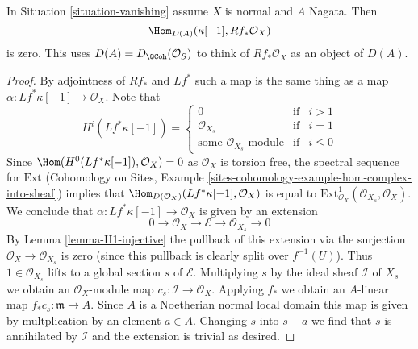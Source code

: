 \begin{lemma}
\label{lemma-R1-injective}
In Situation \ref{situation-vanishing} assume $X$ is normal and $A$ Nagata.
Then
$$
\Hom_{D(A)}(\kappa[-1], Rf_*\mathcal{O}_X)
$$
is zero. This uses $D(A) = D_\QCoh(\mathcal{O}_S)$ to think of
$Rf_*\mathcal{O}_X$ as an object of $D(A)$.
\end{lemma}

\begin{proof}
By adjointness of $Rf_*$ and $Lf^*$ such a map is the same thing
as a map $\alpha : Lf^*\kappa[-1] \to \mathcal{O}_X$. Note that
$$
H^i(Lf^*\kappa[-1]) =
\left\{
\begin{matrix}
0 & \text{if} & i > 1 \\
\mathcal{O}_{X_s} & \text{if} & i = 1 \\
\text{some }\mathcal{O}_{X_s}\text{-module} & \text{if} & i \leq 0
\end{matrix}
\right.
$$
Since $\Hom(H^0(Lf^*\kappa[-1]), \mathcal{O}_X) = 0$ as $\mathcal{O}_X$
is torsion free, the spectral sequence for $\text{Ext}$
(Cohomology on Sites, Example
\ref{sites-cohomology-example-hom-complex-into-sheaf})
implies that
$\Hom_{D(\mathcal{O}_X)}(Lf^*\kappa[-1], \mathcal{O}_X)$ is equal to
$\text{Ext}^1_{\mathcal{O}_X}(\mathcal{O}_{X_s}, \mathcal{O}_X)$.
We conclude that
$\alpha : Lf^*\kappa[-1] \to \mathcal{O}_X$ is given by an extension
$$
0 \to \mathcal{O}_X \to \mathcal{E} \to \mathcal{O}_{X_s} \to 0
$$
By Lemma \ref{lemma-H1-injective} the pullback of this extension
via the surjection $\mathcal{O}_X \to \mathcal{O}_{X_s}$ is zero
(since this pullback is clearly split over $f^{-1}(U)$).
Thus $1 \in \mathcal{O}_{X_s}$ lifts to a global section $s$ of
$\mathcal{E}$. Multiplying $s$ by the ideal sheaf $\mathcal{I}$
of $X_s$ we obtain an $\mathcal{O}_X$-module map
$c_s : \mathcal{I} \to \mathcal{O}_X$. Applying $f_*$ we obtain
an $A$-linear map $f_*c_s : \mathfrak m \to A$. Since $A$ is
a Noetherian normal local domain this map is given by multplication
by an element $a \in A$. Changing $s$ into $s -  a$ we find that
$s$ is annihilated by $\mathcal{I}$ and the extension is trivial
as desired.
\end{proof}

